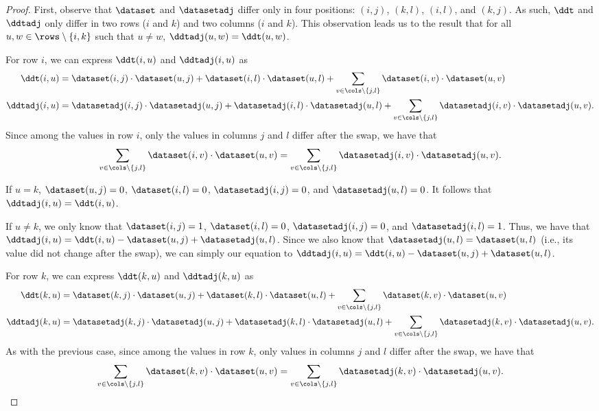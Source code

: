 \begin{proof}
	First, observe that $\dataset$ and $\datasetadj$ differ only in four
	positions: $(i, j)$, $(k, l)$, $(i, l)$, and $(k, j)$. As such, $\ddt$ and
	$\ddtadj$ only differ in two rows ($i$ and $k$) and two columns ($i$ and
	$k$). This observation leads us to the result that for all $u, w \in
	\rows \setminus \{i, k\}$ such that $u \neq w$, $\ddtadj(u, w) =
	\ddt(u, w)$.

	For row $i$, we can express $\ddt(i, u)$ and $\ddtadj(i, u)$ as
	\begin{align*}
		\ddt(i, u) &= \dataset(i, j) \cdot \dataset(u, j) + \dataset(i, l) \cdot
		\dataset(u, l) + \sum_{v \in \cols \setminus \{j, l\}} \dataset(i, v) \cdot
		\dataset(u, v) \\
		\ddtadj(i, u) &= \datasetadj(i, j) \cdot \datasetadj(u, j) + \datasetadj(i,
		l) \cdot \datasetadj(u, l) + \sum_{v \in \cols \setminus \{j, l\}}
		\datasetadj(i, v) \cdot \datasetadj(u, v).
	\end{align*}
	Since among the values in row $i$, only the values in columns
	$j$ and $l$ differ after the swap, we have that
	\[
		\sum_{v \in \cols \setminus \{j, l\}} \dataset(i, v) \cdot \dataset(u, v) =
		\sum_{v \in \cols \setminus \{j, l\}} \datasetadj(i, v) \cdot
		\datasetadj(u, v).
	\]

	If $u = k$, $\dataset(u, j) = 0$, $\dataset(i, l) = 0$, $\datasetadj(i, j) =
	0$, and $\datasetadj(u, l) = 0$. It follows that $\ddtadj(i, u) = \ddt(i,
	u)$.

	If $u \neq k$, we only know that $\dataset(i, j) = 1$, $\dataset(i, l) = 0$,
	$\datasetadj(i, j) = 0$, and $\datasetadj(i, l) = 1$. Thus, we have that
	$\ddtadj(i, u) = \ddt(i, u) - \dataset(u, j) + \datasetadj(u, l)$. Since we
	also know that $\datasetadj(u, l) = \dataset(u, l)$ (i.e., its value did not
	change after the swap), we can simply our equation to $\ddtadj(i, u) =
	\ddt(i, u) - \dataset(u, j) + \dataset(u, l)$.

	For row $k$, we can express $\ddt(k, u)$ and $\ddtadj(k, u)$ as
	\begin{align*}
		\ddt(k, u) &= \dataset(k, j) \cdot \dataset(u, j) + \dataset(k, l) \cdot
		\dataset(u, l) + \sum_{v \in \cols \setminus \{j, l\}} \dataset(k, v) \cdot
		\dataset(u, v) \\
		\ddtadj(k, u) &= \datasetadj(k, j) \cdot \datasetadj(u, j) + \datasetadj(k,
		l) \cdot \datasetadj(u, l) + \sum_{v \in \cols \setminus \{j, l\}}
		\datasetadj(k, v) \cdot \datasetadj(u, v).
	\end{align*}
	As with the previous case, since among the values in row $k$, only values in
	columns $j$ and $l$ differ after the swap, we have that
	\[
		\sum_{v \in \cols \setminus \{j,
		l\}} \dataset(k, v) \cdot \dataset(u, v) = \sum_{v \in \cols \setminus \{j,
		l\}} \datasetadj(k, v) \cdot \datasetadj(u, v).
	\]


\end{proof}
